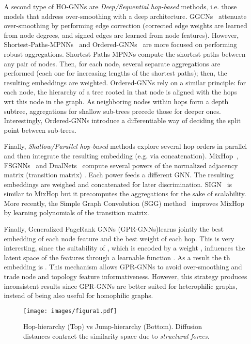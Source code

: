 \documentclass{article}
\theoremstyle{plain}
\theoremstyle{definition}
\begin{document}
A second type of HO-GNNs are \emph{Deep/Sequential hop-based} methods, i.e. those models that address over-smoothing with a deep architecture. GGCNs~\citep{Twosides22} attenuate over-smoothing by performing edge correction (corrected edge weights are learned from node degrees, and signed edges are learned from node features). However, Shortest-Paths-MPNNs~\citep{abboud2022shortest} and Ordered-GNNs~\citep{song2023ordered} are more focused on performing robust aggregations. Shortest-Paths-MPNNs compute the shortest paths between any
pair of nodes. Then, for each node, several separate aggregations are performed (each one for increasing lengths of the shortest paths); then, the resulting embeddings are weighted. Ordered-GNNs rely on a similar principle: for each node, the hierarchy of a tree rooted in that node is aligned with the hops wrt this node in the graph. As neighboring nodes within  hops form a depth subtree, aggregations for shallow sub-trees precede those for deeper ones. Interestingly, Ordered-GNNs introduce a differentiable way of deciding the split point between sub-trees.

Finally, \emph{Shallow/Parallel hop-based} methods explore several hop orders in parallel and then integrate the resulting embedding (e.g. via concatenation). 
MixHop~\citep{mixhop19}, FSGNNs~\citep{FSGNN21} and DualNets~\citep{DualNet22} compute several powers 
of the normalized adjacency matrix (transition matrix) . Each power feeds a different 
GNN. The resulting embeddings are weighed and concatenated for later discrimination. SIGN~\citep{sign_icml_grl2020} is similar to 
MixHop but it precomputes the aggregations  for the sake of scalability. More recently, the Simple Graph Convolution (SGG) method~\citep{chanpuriya2022simplified} improves MixHop by learning polynomials of the transition matrix.  

Finally, Generalized PageRank GNNs (GPR-GNNs)\citep{GPR21}learns jointly the best embedding of each node feature and the best weight of each hop. This is very interesting, since the suitability of , which is encoded by a weight , influences the latent space of the features  through a learnable function . As a result the th embedding is  . This mechanism allows GPR-GNNs to avoid over-smoothing and trade node and topology feature informativeness. However, this strategy produces inconsistent results since GPR-GNNs are better suited for heterophilic graphs, instead of being also useful for homophilic graphs. 



\begin{wrapfigure}{r}{0.35\textwidth}
    \centering
    \texttt{[image: images/figura1.pdf]}
    \caption{Hop-hierarchy (Top) vs Jump-hierarchy (Bottom). Diffusion distances contract the similarity space due to \emph{structural forces}.}
    \label{fig:jump}
\end{wrapfigure}
\end{document}
